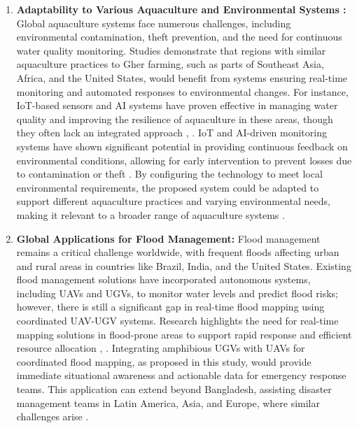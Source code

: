 \documentclass[conference]{IEEEtran}
\begin{document}
\begin{enumerate}
	\item \textbf{Adaptability to Various Aquaculture and Environmental Systems :}
Global aquaculture systems face numerous challenges, including environmental contamination, theft prevention, and the need for continuous water quality monitoring. Studies demonstrate that regions with similar aquaculture practices to Gher farming, such as parts of Southeast Asia, Africa, and the United States, would benefit from systems ensuring real-time monitoring and automated responses to environmental changes. For instance, IoT-based sensors and AI systems have proven effective in managing water quality and improving the resilience of aquaculture in these areas, though they often lack an integrated approach \cite{ref25}, \cite{ref26}. IoT and AI-driven monitoring systems have shown significant potential in providing continuous feedback on environmental conditions, allowing for early intervention to prevent losses due to contamination or theft \cite{ref27}. By configuring the technology to meet local environmental requirements, the proposed system could be adapted to support different aquaculture practices and varying environmental needs, making it relevant to a broader range of aquaculture systems \cite{ref28}.
	
	\item \textbf{ Global Applications for Flood Management:}
	Flood management remains a critical challenge worldwide, with frequent floods affecting urban and rural areas in countries like Brazil, India, and the United States. Existing flood management solutions have incorporated autonomous systems, including UAVs and UGVs, to monitor water levels and predict flood risks; however, there is still a significant gap in real-time flood mapping using coordinated UAV-UGV systems. Research highlights the need for real-time mapping solutions in flood-prone areas to support rapid response and efficient resource allocation \cite{ref29}, \cite{ref30}. Integrating amphibious UGVs with UAVs for coordinated flood mapping, as proposed in this study, would provide immediate situational awareness and actionable data for emergency response teams. This application can extend beyond Bangladesh, assisting disaster management teams in Latin America, Asia, and Europe, where similar challenges arise \cite{ref31}.
	

\end{enumerate}
\end{document}
